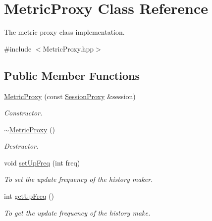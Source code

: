 \hypertarget{classMetricProxy}{
\section{MetricProxy Class Reference}
\label{classMetricProxy}
}


The metric proxy class implementation.  




{\ttfamily \#include $<$MetricProxy.hpp$>$}

\subsection*{Public Member Functions}
\begin{DoxyCompactItemize}
\item 
\hyperlink{classMetricProxy_ac242d028a6f857796c0c07aaf87b3ed4}{MetricProxy} (const \hyperlink{classSessionProxy}{SessionProxy} \&session)
\begin{DoxyCompactList}\small\item\em Constructor. \item\end{DoxyCompactList}\item 
\hypertarget{classMetricProxy_a648da46c09ae1c8416a29f38b6358cb8}{
\hyperlink{classMetricProxy_a648da46c09ae1c8416a29f38b6358cb8}{$\sim$MetricProxy} ()}
\label{classMetricProxy_a648da46c09ae1c8416a29f38b6358cb8}

\begin{DoxyCompactList}\small\item\em Destructor. \item\end{DoxyCompactList}\item 
void \hyperlink{classMetricProxy_a5ece18b6d54a812601014a4b064d87b8}{setUpFreq} (int freq)
\begin{DoxyCompactList}\small\item\em To set the update frequency of the history maker. \item\end{DoxyCompactList}\item 
\hypertarget{classMetricProxy_aeea59e3106bcddff5187e581ee448c01}{
int \hyperlink{classMetricProxy_aeea59e3106bcddff5187e581ee448c01}{getUpFreq} ()}
\label{classMetricProxy_aeea59e3106bcddff5187e581ee448c01}

\begin{DoxyCompactList}\small\item\em To get the update frequency of the history make. \item\end{DoxyCompactList}\end{DoxyCompactItemize}
